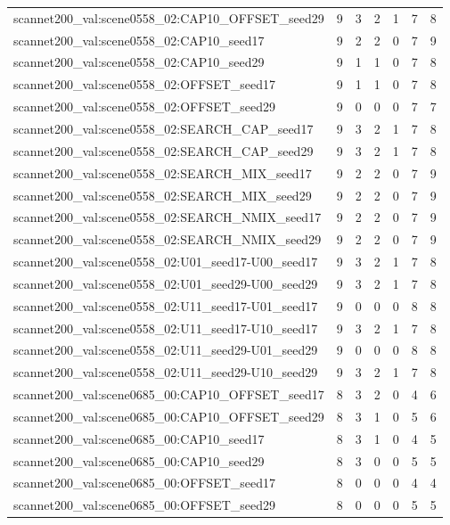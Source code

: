 \begin{table}[t]
\begin{tabular}{lrrrrrr}
scannet200\_val:scene0558\_02:CAP10\_OFFSET\_seed29 & 9 & 3 & 2 & 1 & 7 & 8 \\
scannet200\_val:scene0558\_02:CAP10\_seed17 & 9 & 2 & 2 & 0 & 7 & 9 \\
scannet200\_val:scene0558\_02:CAP10\_seed29 & 9 & 1 & 1 & 0 & 7 & 8 \\
scannet200\_val:scene0558\_02:OFFSET\_seed17 & 9 & 1 & 1 & 0 & 7 & 8 \\
scannet200\_val:scene0558\_02:OFFSET\_seed29 & 9 & 0 & 0 & 0 & 7 & 7 \\
scannet200\_val:scene0558\_02:SEARCH\_CAP\_seed17 & 9 & 3 & 2 & 1 & 7 & 8 \\
scannet200\_val:scene0558\_02:SEARCH\_CAP\_seed29 & 9 & 3 & 2 & 1 & 7 & 8 \\
scannet200\_val:scene0558\_02:SEARCH\_MIX\_seed17 & 9 & 2 & 2 & 0 & 7 & 9 \\
scannet200\_val:scene0558\_02:SEARCH\_MIX\_seed29 & 9 & 2 & 2 & 0 & 7 & 9 \\
scannet200\_val:scene0558\_02:SEARCH\_NMIX\_seed17 & 9 & 2 & 2 & 0 & 7 & 9 \\
scannet200\_val:scene0558\_02:SEARCH\_NMIX\_seed29 & 9 & 2 & 2 & 0 & 7 & 9 \\
scannet200\_val:scene0558\_02:U01\_seed17-U00\_seed17 & 9 & 3 & 2 & 1 & 7 & 8 \\
scannet200\_val:scene0558\_02:U01\_seed29-U00\_seed29 & 9 & 3 & 2 & 1 & 7 & 8 \\
scannet200\_val:scene0558\_02:U11\_seed17-U01\_seed17 & 9 & 0 & 0 & 0 & 8 & 8 \\
scannet200\_val:scene0558\_02:U11\_seed17-U10\_seed17 & 9 & 3 & 2 & 1 & 7 & 8 \\
scannet200\_val:scene0558\_02:U11\_seed29-U01\_seed29 & 9 & 0 & 0 & 0 & 8 & 8 \\
scannet200\_val:scene0558\_02:U11\_seed29-U10\_seed29 & 9 & 3 & 2 & 1 & 7 & 8 \\
scannet200\_val:scene0685\_00:CAP10\_OFFSET\_seed17 & 8 & 3 & 2 & 0 & 4 & 6 \\
scannet200\_val:scene0685\_00:CAP10\_OFFSET\_seed29 & 8 & 3 & 1 & 0 & 5 & 6 \\
scannet200\_val:scene0685\_00:CAP10\_seed17 & 8 & 3 & 1 & 0 & 4 & 5 \\
scannet200\_val:scene0685\_00:CAP10\_seed29 & 8 & 3 & 0 & 0 & 5 & 5 \\
scannet200\_val:scene0685\_00:OFFSET\_seed17 & 8 & 0 & 0 & 0 & 4 & 4 \\
scannet200\_val:scene0685\_00:OFFSET\_seed29 & 8 & 0 & 0 & 0 & 5 & 5 \\

\end{tabular}
\end{table}
